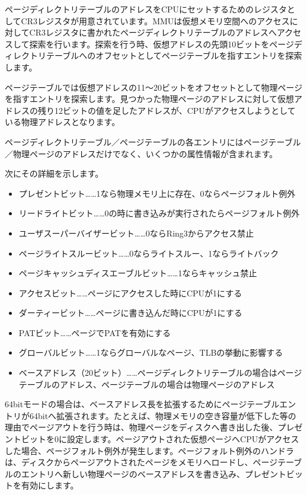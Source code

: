 ページディレクトリテーブルのアドレスをCPUにセットするためのレジスタとしてCR3レジスタが用意されています。MMUは仮想メモリ空間へのアクセスに対してCR3レジスタに書かれたページディレクトリテーブルのアドレスへアクセスして探索を行います。探索を行う時、仮想アドレスの先頭10ビットをページディレクトリテーブルへのオフセットとしてページテーブルを指すエントリを探索します。

ページテーブルでは仮想アドレスの11～20ビットをオフセットとして物理ページを指すエントリを探索します。見つかった物理ページのアドレスに対して仮想アドレスの残り12ビットの値を足したアドレスが、CPUがアクセスしようとしている物理アドレスとなります。

ページディレクトリテーブル／ページテーブルの各エントリにはページテーブル／物理ページのアドレスだけでなく、いくつかの属性情報が含まれます。

次にその詳細を示します。

\begin{itemize}
 \item プレゼントビット……1なら物理メモリ上に存在、0ならページフォルト例外
 \item リードライトビット……0の時に書き込みが実行されたらページフォルト例外
 \item ユーザスーパーバイザービット……0ならRing3からアクセス禁止
 \item ページライトスルービット……0ならライトスルー、1ならライトバック
 \item ページキャッシュディスエーブルビット……1ならキャッシュ禁止
 \item アクセスビット……ページにアクセスした時にCPUが1にする
 \item ダーティービット……ページに書き込んだ時にCPUが1にする
 \item PATビット……ページでPATを有効にする
 \item グローバルビット……1ならグローバルなページ、TLBの挙動に影響する
 \item ベースアドレス（20ビット）……ページディレクトリテーブルの場合はページテーブルのアドレス、ページテーブルの場合は物理ページのアドレス
\end{itemize}

64bitモードの場合は、ベースアドレス長を拡張するためにページテーブルエントリが64bitへ拡張されます。たとえば、物理メモリの空き容量が低下した等の理由でページアウトを行う時は、物理ページをディスクへ書き出した後、プレゼントビットを0に設定します。ページアウトされた仮想ページへCPUがアクセスした場合、ページフォルト例外が発生します。ページフォルト例外のハンドラは、ディスクからページアウトされたページをメモリへロードし、ページテーブルのエントリへ新しい物理ページのベースアドレスを書き込み、プレゼントビットを有効にします。

